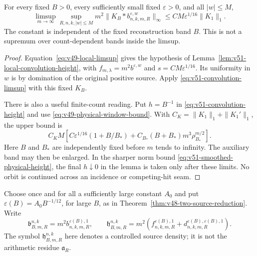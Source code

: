 \begin{lemma}
\label{lem:v51-smoothed-physical-height}
For every fixed $B>0$, every sufficiently small fixed
$\varepsilon>0$, and all $|w|\le M$,
\begin{equation}\label{eq:v51-smoothed-physical-height}
 \limsup_{m\to\infty}\sup_{R,n,k,|w|\le M}
       m^2\|K_B*b^{\varepsilon,w}_{n,k,m,R}\|_\infty
                         \le CM\varepsilon^{1/16}\|K_1\|_1.
\end{equation}
The constant is independent of the fixed reconstruction band $B$.
This is not a supremum over count-dependent bands inside the limsup.
\end{lemma}
\begin{proof}
Equation~\eqref{eq:v49-local-limsup} gives the hypothesis of
Lemma~\ref{lem:v51-local-convolution-height}, with
$f_{m,\lambda}=m^2b^{\varepsilon,w}$ and
$s=CM\varepsilon^{1/16}$. Its uniformity in $w$ is by domination
of the original positive source. Apply
\eqref{eq:v51-convolution-limsup} with this fixed $K_B$.

There is also a useful finite-count reading. Put $h=B^{-1}$ in
\eqref{eq:v51-convolution-height} and use
\eqref{eq:v49-physical-window-bound}. With
$C_K=\|K_1\|_1+\|K_1'\|_1$, the upper bound is
\begin{equation}\label{eq:v51-smoothed-finite}
 C_KM\left[C\varepsilon^{1/16}(1+B/B_*)
       +C_{B_*}(B+B_*)m^3\rho_{B_*}^{m/2}\right].
\end{equation}
Here $B$ and $B_*$ are independently fixed before $m$ tends to
infinity. The auxiliary band may then be enlarged. In the sharper
norm bound \eqref{eq:v51-smoothed-physical-height}, the final
$h\downarrow0$ in the lemma is taken only after these limits.
No orbit is continued across an incidence or competing-hit seam.
\end{proof}

Choose once and for all a sufficiently large constant $A_0$ and put
$\varepsilon(B)=A_0B^{-1/12}$, for large $B$, as in
Theorem~\ref{thm:v48-two-source-reduction}. Write
\[
 \mathfrak b_{B,m,R}^{n,k}=m^2b^{\varepsilon(B),1}_{n,k,m,R},\qquad
 \mathfrak h_{B,m,R}^{n,k}
       =m^2(f^{\varepsilon(B),1}_{n,k,m,R}
                  +d^{\varepsilon(B),\varepsilon(B),1}_{n,k,m,R}).
\]
The symbol $\mathfrak h_{B,m,R}^{n,k}$ here denotes a controlled
source density; it is not the arithmetic residue $\mathfrak a_R$.


